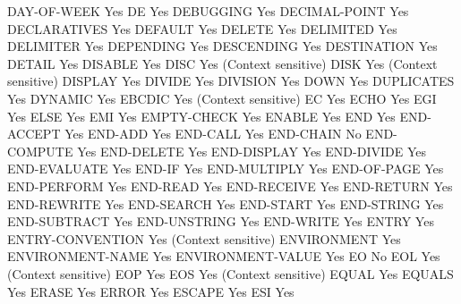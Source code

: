 DAY-OF-WEEK                     Yes
DE                              Yes
DEBUGGING                       Yes
DECIMAL-POINT                   Yes
DECLARATIVES                    Yes
DEFAULT                         Yes
DELETE                          Yes
DELIMITED                       Yes
DELIMITER                       Yes
DEPENDING                       Yes
DESCENDING                      Yes
DESTINATION                     Yes
DETAIL                          Yes
DISABLE                         Yes
DISC                            Yes (Context sensitive)
DISK                            Yes (Context sensitive)
DISPLAY                         Yes
DIVIDE                          Yes
DIVISION                        Yes
DOWN                            Yes
DUPLICATES                      Yes
DYNAMIC                         Yes
EBCDIC                          Yes (Context sensitive)
EC                              Yes
ECHO                            Yes
EGI                             Yes
ELSE                            Yes
EMI                             Yes
EMPTY-CHECK                     Yes
ENABLE                          Yes
END                             Yes
END-ACCEPT                      Yes
END-ADD                         Yes
END-CALL                        Yes
END-CHAIN                       No
END-COMPUTE                     Yes
END-DELETE                      Yes
END-DISPLAY                     Yes
END-DIVIDE                      Yes
END-EVALUATE                    Yes
END-IF                          Yes
END-MULTIPLY                    Yes
END-OF-PAGE                     Yes
END-PERFORM                     Yes
END-READ                        Yes
END-RECEIVE                     Yes
END-RETURN                      Yes
END-REWRITE                     Yes
END-SEARCH                      Yes
END-START                       Yes
END-STRING                      Yes
END-SUBTRACT                    Yes
END-UNSTRING                    Yes
END-WRITE                       Yes
ENTRY                           Yes
ENTRY-CONVENTION                Yes (Context sensitive)
ENVIRONMENT                     Yes
ENVIRONMENT-NAME                Yes
ENVIRONMENT-VALUE               Yes
EO                              No
EOL                             Yes (Context sensitive)
EOP                             Yes
EOS                             Yes (Context sensitive)
EQUAL                           Yes
EQUALS                          Yes
ERASE                           Yes
ERROR                           Yes
ESCAPE                          Yes
ESI                             Yes
